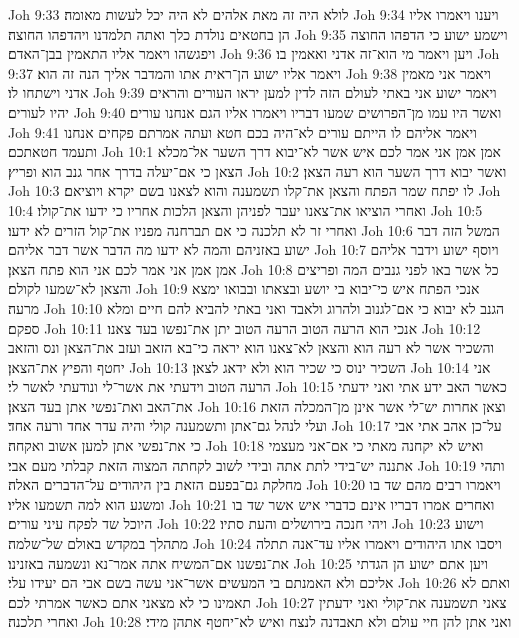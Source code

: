 Joh 9:33  לולא היה זה מאת אלהים לא היה יכל לעשות מאומה׃
Joh 9:34  ויענו ויאמרו אליו הן בחטאים נולדת כלך ואתה תלמדנו ויהדפהו החוצה׃
Joh 9:35  וישמע ישוע כי הדפהו החוצה ויפגשהו ויאמר אליו התאמין בבן־האדם׃
Joh 9:36  ויען ויאמר מי הוא־זה אדני ואאמין בו׃
Joh 9:37  ויאמר אליו ישוע הן־ראית אתו והמדבר אליך הנה זה הוא׃
Joh 9:38  ויאמר אני מאמין אדני וישתחו לו׃
Joh 9:39  ויאמר ישוע אני באתי לעולם הזה לדין למען יראו העורים והראים יהיו לעורים׃
Joh 9:40  ואשר היו עמו מן־הפרושים שמעו דבריו ויאמרו אליו הגם אנחנו עורים׃
Joh 9:41  ויאמר אליהם לו הייתם עורים לא־היה בכם חטא ועתה אמרתם פקחים אנחנו ותעמד חטאתכם׃
Joh 10:1  אמן אמן אני אמר לכם איש אשר לא־יבוא דרך השער אל־מכלא הצאן כי אם־יעלה בדרך אחר גנב הוא ופריץ׃
Joh 10:2  ואשר יבוא דרך השער הוא רעה הצאן׃
Joh 10:3  לו יפתח שמר הפתח והצאן את־קלו תשמענה והוא לצאנו בשם יקרא ויוציאם׃
Joh 10:4  ואחרי הוציאו את־צאנו יעבר לפניהן והצאן הלכות אחריו כי ידעו את־קולו׃
Joh 10:5  ואחרי זר לא תלכנה כי אם תברחנה מפניו את־קול הזרים לא ידעו׃
Joh 10:6  המשל הזה דבר ישוע באזניהם והמה לא ידעו מה הדבר אשר דבר אליהם׃
Joh 10:7  ויוסף ישוע וידבר אליהם אמן אמן אני אמר לכם אני הוא פתח הצאן׃
Joh 10:8  כל אשר באו לפני גנבים המה ופריצים והצאן לא־שמעו לקולם׃
Joh 10:9  אנכי הפתח איש כי־יבוא בי יושע ובצאתו ובבואו ימצא מרעה׃
Joh 10:10  הגנב לא יבוא כי אם־לגנוב ולהרוג ולאבד ואני באתי להביא להם חיים ומלא ספקם׃
Joh 10:11  אנכי הוא הרעה הטוב הרעה הטוב יתן את־נפשו בעד צאנו׃
Joh 10:12  והשכיר אשר לא רעה הוא והצאן לא־צאנו הוא יראה כי־בא הזאב ועזב את־הצאן ונס והזאב יחטף והפיץ את־הצאן׃
Joh 10:13  השכיר ינוס כי שכיר הוא ולא ידאג לצאן׃
Joh 10:14  אני הרעה הטוב וידעתי את אשר־לי ונודעתי לאשר לי׃
Joh 10:15  כאשר האב ידע אתי ואני ידעתי את־האב ואת־נפשי אתן בעד הצאן׃
Joh 10:16  וצאן אחרות יש־לי אשר אינן מן־המכלה הזאת ועלי לנהל גם־אתן ותשמענה קולי והיה עדר אחד ורעה אחד׃
Joh 10:17  על־כן אהב אתי אבי כי את־נפשי אתן למען אשוב ואקחה׃
Joh 10:18  ואיש לא יקחנה מאתי כי אם־אני מעצמי אתננה יש־בידי לתת אתה ובידי לשוב לקחתה המצוה הזאת קבלתי מעם אבי׃
Joh 10:19  ותהי מחלקת גם־בפעם הזאת בין היהודים על־הדברים האלה׃
Joh 10:20  ויאמרו רבים מהם שד בו ומשגע הוא למה תשמעו אליו׃
Joh 10:21  ואחרים אמרו דבריו אינם כדברי איש אשר שד בו היוכל שד לפקח עיני עורים׃
Joh 10:22  ויהי חנכה בירושלים והעת סתיו׃
Joh 10:23  וישוע מתהלך במקדש באולם של־שלמה׃
Joh 10:24  ויסבו אתו היהודים ויאמרו אליו עד־אנה תתלה את־נפשנו אם־המשיח אתה אמר־נא ונשמעה באזנינו׃
Joh 10:25  ויען אתם ישוע הן הגדתי אליכם ולא האמנתם בי המעשים אשר־אני עשה בשם אבי הם יעידו עלי׃
Joh 10:26  ואתם לא תאמינו כי לא מצאני אתם כאשר אמרתי לכם׃
Joh 10:27  צאני תשמענה את־קולי ואני ידעתין ואחרי תלכנה׃
Joh 10:28  ואני אתן להן חיי עולם ולא תאבדנה לנצח ואיש לא־יחטף אתהן מידי׃
